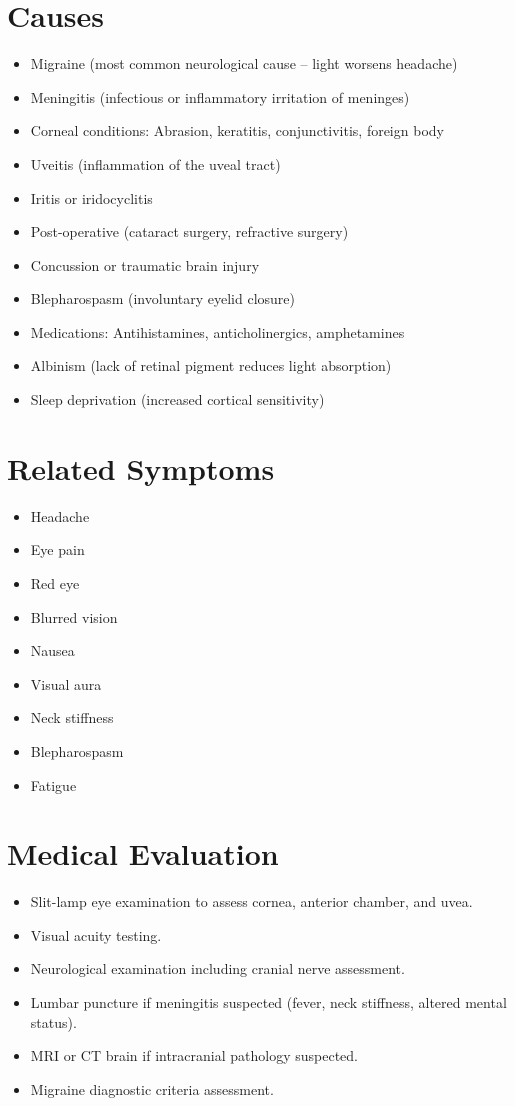 \section*{Causes}
\begin{itemize}
  \item Migraine (most common neurological cause -- light worsens headache)
  \item Meningitis (infectious or inflammatory irritation of meninges)
  \item Corneal conditions: Abrasion, keratitis, conjunctivitis, foreign body
  \item Uveitis (inflammation of the uveal tract)
  \item Iritis or iridocyclitis
  \item Post-operative (cataract surgery, refractive surgery)
  \item Concussion or traumatic brain injury
  \item Blepharospasm (involuntary eyelid closure)
  \item Medications: Antihistamines, anticholinergics, amphetamines
  \item Albinism (lack of retinal pigment reduces light absorption)
  \item Sleep deprivation (increased cortical sensitivity)
\end{itemize}

\section*{Related Symptoms}
\begin{itemize}
  \item Headache
  \item Eye pain
  \item Red eye
  \item Blurred vision
  \item Nausea
  \item Visual aura
  \item Neck stiffness
  \item Blepharospasm
  \item Fatigue
\end{itemize}

\section*{Medical Evaluation}
\begin{itemize}
  \item Slit-lamp eye examination to assess cornea, anterior chamber, and uvea.
  \item Visual acuity testing.
  \item Neurological examination including cranial nerve assessment.
  \item Lumbar puncture if meningitis suspected (fever, neck stiffness, altered mental status).
  \item MRI or CT brain if intracranial pathology suspected.
  \item Migraine diagnostic criteria assessment.
\end{itemize}


